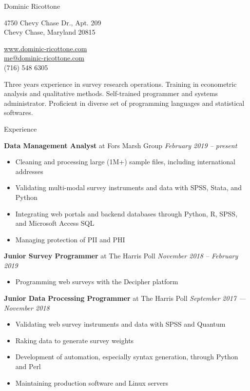 \documentclass[12pt]{article}
\newenvironment{name}{
  \begin{center} \huge \bfseries
}{
  \end{center} \normalsize
}
\newenvironment{contact}{
  \begin{multicols}{2} \footnotesize
}{
  \end{multicols}
}
\newenvironment{division}{
  \vspace{.1in} \large \bfseries
}{
  \hrulefill \normalsize \vspace{.1in}
}
\newenvironment{details}{
  \begin{itemize}[label={}] \small \setlength{\itemsep}{0pt}
}{
  \end{itemize} \normalsize
}
\begin{document}
\begin{name}
  Dominic Ricottone
\end{name}

\begin{contact}
  \begin{center}
  4750 Chevy Chase Dr., Apt. 209 \\
  Chevy Chase, Maryland 20815 \\
  \end{center}
  \columnbreak
  \faCloud \quad    \href{https://www.dominic-ricottone.com}{www.dominic-ricottone.com} \\
  \faEnvelope \quad \href{mailto:me@dominic-ricottone.com}{me@dominic-ricottone.com} \\
  \faPhone \quad    (716) 548 6305
\end{contact}

\begin{flushleft}
  Three years experience in survey research operations.
  Training in econometric analysis and qualitative methods.
  Self-trained programmer and systems administrator.
  Proficient in diverse set of programming languages and statistical softwares.
\end{flushleft}

\begin{division}
  Experience
\end{division}

\textbf{Data Management Analyst} at Fors Marsh Group \hfill \textit{February 2019 -- present}
\begin{details}
  \item Cleaning and processing large (1M+) sample files, including international addresses
  \item Validating multi-modal survey instruments and data with SPSS, Stata, and Python
  \item Integrating web portals and backend databases through Python, R, SPSS, and Microsoft Access SQL
  \item Managing protection of PII and PHI
\end{details}

\textbf{Junior Survey Programmer} at The Harris Poll \hfill \textit{November 2018 -- February 2019}
\begin{details}
  \item Programming web surveys with the Decipher platform
\end{details}

\textbf{Junior Data Processing Programmer} at The Harris Poll \hfill \textit{September 2017 --- November 2018}
\begin{details}
  \item Validating web survey instruments and data with SPSS and Quantum
  \item Raking data to generate survey weights
  \item Development of automation, especially syntax generation, through Python and Perl
  \item Maintaining production software and Linux servers
\end{details}
\end{document}
